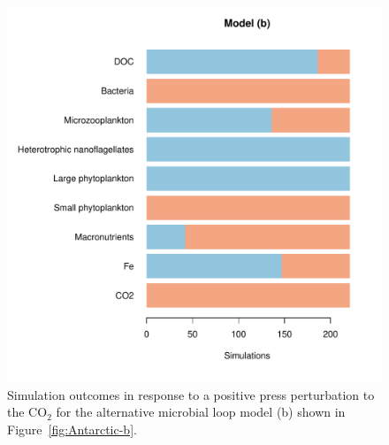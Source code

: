 \documentclass[a4paper]{article}\usepackage[]{graphicx}\usepackage[]{color}
\makeatletter
\def\maxwidth{ %
  \ifdim\Gin@nat@width>\linewidth
    \linewidth
  \else
    \Gin@nat@width
  \fi
}
\newenvironment{knitrout}{}{} %
\makeatother
\begin{document}
\begin{figure}[ht]
  \centering
\begin{knitrout}
\color{fgcolor}
\includegraphics[width=\maxwidth]{figure/unnamed-chunk-10-1} 

\end{knitrout}
\caption{Simulation outcomes in response to a positive press perturbation to the
  $\mathrm{CO}_{2}$ for the alternative microbial loop model (b) shown in
  Figure~\ref{fig:Antarctic-b}.}
  \label{fig:Perturb3}
\end{figure}
\end{document}
